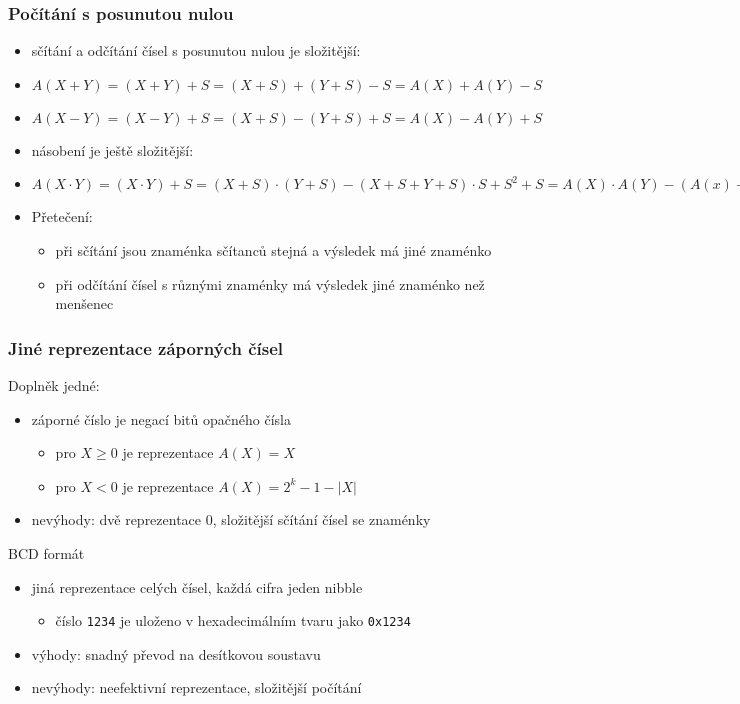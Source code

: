 \documentclass{beamer}
\begin{document}
\begin{frame}
\frametitle{Počítání s posunutou nulou}

\begin{itemize}
\item sčítání a odčítání čísel s posunutou nulou je složitější:
\item $A ( X + Y )=( X + Y )+S =( X + S )+(Y + S ) - S = A ( X )+ A (Y ) -S$
\item $A ( X - Y )=( X - Y )+ S =( X + S ) - (Y +S )+S = A ( X ) - A (Y )+S$
\item násobení je ještě složitější:
\item $A ( X \cdot Y )=( X \cdot Y )+S =( X + S )\cdot(Y + S )-( X + S +Y +S )\cdot S + S^2+ S
= A ( X )\cdot A (Y ) - ( A ( x)+ A ( y ))\cdot S + S^2 +S$
\end{itemize}
\bigskip
\begin{itemize}
\item Přetečení:
\begin{itemize}
\item při sčítání jsou znaménka sčítanců stejná a výsledek má jiné znaménko
\item při odčítání čísel s různými znaménky má výsledek jiné znaménko než menšenec
\end{itemize}
\end{itemize}
\end{frame}


\begin{frame}
\frametitle{Jiné reprezentace záporných čísel}

Doplněk jedné:
\begin{itemize}
\item záporné číslo je negací bitů opačného čísla 
\begin{itemize}
\item pro $X\ge0$ je reprezentace $A(X) = X$
\item pro $X<0$ je reprezentace $A(X) = 2^k-1-|X|$
\end{itemize}
\item nevýhody: dvě reprezentace 0, složitější sčítání čísel se znaménky
\end{itemize}
\bigskip
BCD formát
\begin{itemize}
\item jiná reprezentace celých čísel, každá cifra jeden nibble 
\begin{itemize}
\item číslo \texttt{1234} je uloženo v hexadecimálním tvaru jako \texttt{0x1234}
\end{itemize}
\item výhody: snadný převod na desítkovou soustavu
\item nevýhody: neefektivní reprezentace, složitější počítání
\end{itemize}
\end{frame}
\end{document}
